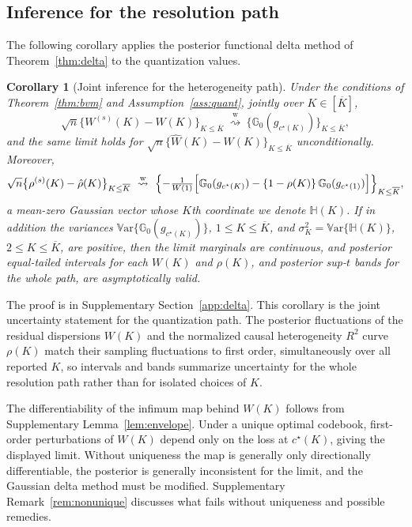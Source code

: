 \documentclass[11pt]{article}
\newtheorem{corollary}{Corollary}
\newcommand{\G}{\mathbb G}
\newcommand{\Var}{\mathbb V\mathrm{ar}}
\newcommand{\dtow}{\overset{\mathrm w}{\rightsquigarrow}}
\begin{document}
\subsection{Inference for the resolution path}\label{sec:path_theory}
The following corollary applies the posterior functional delta method of Theorem~\ref{thm:delta} to the quantization values.
\begin{corollary}[Joint inference for the heterogeneity path]\label{cor:path}
Under the conditions of Theorem~\ref{thm:bvm} and Assumption~\ref{ass:quant}, jointly over $K\in[\overline K]$,
\begin{equation*}
\sqrt n\bigl\{W^{(s)}(K)-\widehat W(K)\bigr\}_{K\le\overline K}\ \dtow\ \bigl\{\G_0(g_{c^\star(K)})\bigr\}_{K\le\overline K},
\end{equation*}
and the same limit holds for $\sqrt n\{\widehat W(K)-W(K)\}_{K\le\overline K}$ unconditionally.  Moreover,
\begin{equation*}
\sqrt n\bigl\{\rho^{(s)}(K)-\hat\rho(K)\bigr\}_{K\le\overline K}\ \dtow\ \Bigl\{-\tfrac1{W(1)}\Bigl[\G_0(g_{c^\star(K)})-\{1-\rho(K)\}\,\G_0(g_{c^\star(1)})\Bigr]\Bigr\}_{K\le\overline K},
\end{equation*}
a mean-zero Gaussian vector whose $K$th coordinate we denote $\mathbb H(K)$.  If in addition the variances $\Var\{\G_0(g_{c^\star(K)})\}$, $1\le K\le\overline K$, and $\sigma_K^2=\Var\{\mathbb H(K)\}$, $2\le K\le\overline K$, are positive, then the limit marginals are continuous, and posterior equal-tailed intervals for each $W(K)$ and $\rho(K)$, and posterior sup-$t$ bands for the whole path, are asymptotically valid.
\end{corollary}
The proof is in Supplementary Section~\ref{app:delta}. This corollary is the joint uncertainty statement for the quantization path. The posterior fluctuations of the residual dispersions $W(K)$ and the normalized causal heterogeneity $R^2$ curve $\rho(K)$ match their sampling fluctuations to first order, simultaneously over all reported $K$, so intervals and bands summarize uncertainty for the whole resolution path rather than for isolated choices of $K$.

The differentiability of the infimum map behind $W(K)$ follows from Supplementary Lemma~\ref{lem:envelope}. Under a unique optimal codebook, first-order perturbations of $W(K)$ depend only on the loss at $c^\star(K)$, giving the displayed limit. Without uniqueness the map is generally only directionally differentiable, the posterior is generally inconsistent for the limit, and the Gaussian delta method must be modified. Supplementary Remark~\ref{rem:nonunique} discusses what fails without uniqueness and possible remedies.
\end{document}
